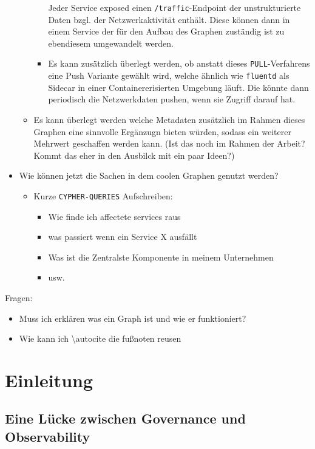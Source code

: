 \documentclass[
	12pt,
	BCOR=5mm,
	DIV=12,
	headinclude=on,
	footinclude=off,
	parskip=half,
	bibliography=totoc,
	listof=entryprefix,
	toc=listof,
	numbers=noenddot,
	plainfootsepline
]{scrreprt}
\begin{document}
\begin{itemize}
\begin{itemize}
\begin{itemize}
			Jeder Service exposed einen \texttt{/traffic}-Endpoint der unstrukturierte Daten bzgl. der Netzwerkaktivität enthält. Diese können dann in einem Service der für den Aufbau des Graphen zuständig ist zu ebendiesem umgewandelt werden.
			\item Es kann zusätzlich überlegt werden, ob anstatt dieses \texttt{PULL}-Verfahrens eine Push Variante gewählt wird, welche ähnlich wie \texttt{fluentd} als Sidecar in einer Containererisierten Umgebung läuft. Die könnte dann periodisch die Netzwerkdaten pushen, wenn sie Zugriff darauf hat.
		\end{itemize}
		\item Es kann überlegt werden welche Metadaten zusätzlich im Rahmen dieses Graphen eine sinnvolle Ergänzugn bieten würden, sodass ein weiterer Mehrwert geschaffen werden kann. (Ist das noch im Rahmen der Arbeit? Kommt das eher in den Ausbilck mit ein paar Ideen?)
	\end{itemize}
	\item Wie können jetzt die Sachen in dem coolen Graphen genutzt werden?
	\begin{itemize}
		\item Kurze \texttt{CYPHER-QUERIES} Aufschreiben:
		\begin{itemize}
			\item Wie finde ich affectete services raus
			\item was passiert wenn ein Service X ausfällt
			\item Was ist die Zentralste Komponente in meinem Unternehmen
			\item usw.
		\end{itemize}
	\end{itemize}
\end{itemize}

Fragen:
\begin{itemize}
	\item Muss ich erklären was ein Graph ist und wie er funktioniert?
	\item Wie kann ich \textbackslash autocite die fußnoten reusen
\end{itemize}

\chapter{Einleitung}



\section{Eine Lücke zwischen Governance und Observability}
\end{document}
